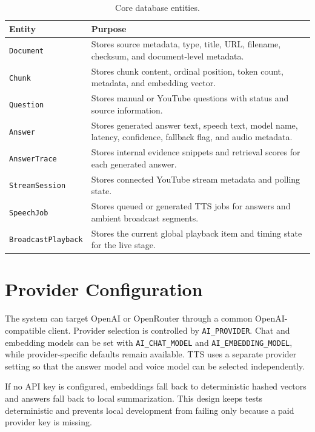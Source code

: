 \begin{table}[!htbp]
    \centering
    \caption{\label{tab:data-model}Core database entities.}
    \begin{tabularx}{\textwidth}{lX}
        \toprule
        Entity & Purpose \\
        \midrule
        \texttt{Document} & Stores source metadata, type, title, URL, filename, checksum, and document-level metadata. \\
        \texttt{Chunk} & Stores chunk content, ordinal position, token count, metadata, and embedding vector. \\
        \texttt{Question} & Stores manual or YouTube questions with status and source information. \\
        \texttt{Answer} & Stores generated answer text, speech text, model name, latency, confidence, fallback flag, and audio metadata. \\
        \texttt{AnswerTrace} & Stores internal evidence snippets and retrieval scores for each generated answer. \\
        \texttt{StreamSession} & Stores connected YouTube stream metadata and polling state. \\
        \texttt{SpeechJob} & Stores queued or generated TTS jobs for answers and ambient broadcast segments. \\
        \texttt{BroadcastPlayback} & Stores the current global playback item and timing state for the live stage. \\
        \bottomrule
    \end{tabularx}
\end{table}

\section{Provider Configuration}

The system can target OpenAI or OpenRouter through a common OpenAI-compatible client. Provider selection is controlled by \texttt{AI\_PROVIDER}. Chat and embedding models can be set with \texttt{AI\_CHAT\_MODEL} and \texttt{AI\_EMBEDDING\_MODEL}, while provider-specific defaults remain available. TTS uses a separate provider setting so that the answer model and voice model can be selected independently.

If no API key is configured, embeddings fall back to deterministic hashed vectors and answers fall back to local summarization. This design keeps tests deterministic and prevents local development from failing only because a paid provider key is missing.


